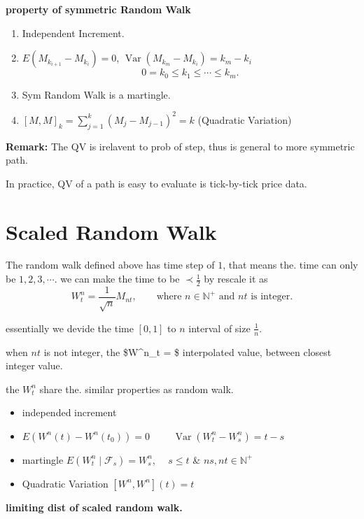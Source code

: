 \documentclass[
  letterpaper,
  DIV=11,
  numbers=noendperiod]{scrreprt}
\providecommand{\tightlist}{%
  \setlength{\itemsep}{0pt}\setlength{\parskip}{0pt}}
\theoremstyle{definition}
\theoremstyle{plain}
\theoremstyle{plain}
\theoremstyle{definition}
\theoremstyle{plain}
\theoremstyle{plain}
\theoremstyle{remark}
\begin{document}
\textbf{property of symmetric Random Walk}

\begin{enumerate}
\def\labelenumi{\arabic{enumi}.}
\item
  Independent Increment.
\item
  \(E(M_{k_{i+1}} - M_{k_i}) = 0\),
  \(\operatorname{Var}(M_{k_m} - M_{k_i}) = k_m - k_i\) \[
  0 = k_0 \leq k_1 \leq \cdots \leq k_m.
  \]
\item
  Sym Random Walk is a martingle.
\item
  \([M, M]_k = \sum_{j=1}^{k} (M_j - M_{j-1})^2 = k\) (Quadratic
  Variation)
\end{enumerate}

\textbf{Remark:} The QV is irelavent to prob of step, thus is general to
more symmetric path.

In practice, QV of a path is easy to evaluate is tick-by-tick price
data.

\section{Scaled Random Walk}\label{scaled-random-walk}

The random walk defined above has time step of \(1\), that means the.
time can only be \(1, 2, 3, \cdots\). we can make the time to be
\(\prec \tfrac12\) by rescale it as \[
W^n_t = \frac{1}{\sqrt{n}} M_{nt}, \qquad \text{where } n \in \mathbb{N}^+ \text{ and } nt \text{ is integer}.
\]

essentially we devide the time \([0, 1]\) to \(n\) interval of size
\(\tfrac1n\).

when \(nt\) is not integer, the \$W\^{}n\_t = \$ interpolated value,
between closest integer value.

the \(W^n_t\) share the. similar properties as random walk.

\begin{itemize}
\tightlist
\item
  independed increment
\item
  \(E(W^n(t) - W^n(t_0)) = 0\)
  \(\qquad \operatorname{Var}(W^n_t - W^n_s) = t - s\)
\item
  martingle \(E(W^n_t \mid \mathcal{F}_s) = W^n_s\), \(\quad s \leq t\)
  \& \(ns, nt \in \mathbb{N}^+\)
\item
  Quadratic Variation \([W^n, W^n](t) = t\)
\end{itemize}

\textbf{limiting dist of scaled random walk.}
\end{document}
